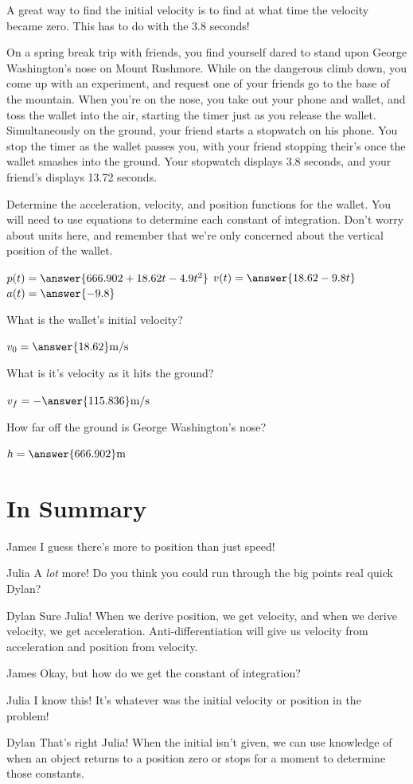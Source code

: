\documentclass{ximera}
\begin{document}
\begin{question}
\begin{hint}
A great way to find the initial velocity is to find at what time the velocity became zero. This has to do with the 3.8 seconds!
\end{hint}
On a spring break trip with friends, you find yourself dared to stand upon George Washington's nose on Mount Rushmore. While on the dangerous climb down, you come up with an experiment, and request one of your friends go to the base of the mountain. When you're on the nose, you take out your phone and wallet, and toss the wallet into the air, starting the timer just as you release the wallet. Simultaneously on the ground, your friend starts a stopwatch on his phone. You stop the timer as the wallet passes you, with your friend stopping their's once the wallet smashes into the ground. Your stopwatch displays 3.8 seconds, and your friend's displays 13.72 seconds.

Determine the acceleration, velocity, and position functions for the wallet. You will need to use equations to determine each constant of integration. Don't worry about units here, and remember that we're only concerned about the vertical position of the wallet.

$p(t) = \answer{666.902+18.62t-4.9t^2}$
$v(t) = \answer{18.62-9.8t}$
$a(t) = \answer{-9.8}$

What is the wallet's initial velocity?

$v_0 = \answer{18.62} \text{m} / \text{s}$

What is it's velocity as it hits the ground?

$v_f = -\answer{115.836} \text{m} / \text{s}$

How far off the ground is George Washington's nose?

$h = \answer{666.902} \text{m}$
\end{question}

\section{In Summary}
\begin{dialogue}
\item[James] I guess there's more to position than just speed!
\item[Julia] A \textit{lot} more! Do you think you could run through the big points real quick Dylan?
\item[Dylan] Sure Julia! When we derive position, we get velocity, and when we derive velocity, we get acceleration. Anti-differentiation will give us velocity from acceleration and position from velocity.
\item[James] Okay, but how do we get the constant of integration?
\item[Julia] I know this! It's whatever was the initial velocity or position in the problem!
\item[Dylan] That's right Julia! When the initial isn't given, we can use knowledge of when an object returns to a position zero or stops for a moment to determine those constants.
\end{dialogue}
\end{document}
